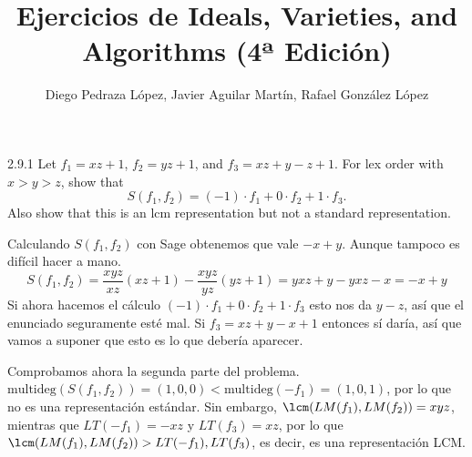\documentclass[twoside]{article}
\begin{document}
\title{Ejercicios de Ideals, Varieties, and Algorithms (4ª Edición)}
\author{Diego Pedraza López, Javier Aguilar Martín, Rafael González López}
\maketitle


\begin{ejercicio}{2.9.1}
Let $f_1 = xz +1$, $f_2 = yz+ 1$, and $f_3 = xz +y−z +1$. For lex order with $x > y > z$, show
that
$$S( f_1, f_2) = (−1)\cdot f_1 + 0\cdot  f_2 + 1 \cdot f_3.$$
Also show that this is an lcm representation but not a standard representation.
\end{ejercicio}
\begin{solucion}
Calculando $S(f_1,f_2)$ con Sage obtenemos que vale $-x+y$. Aunque tampoco es difícil hacer a mano.
\[
S(f_1,f_2)=\frac{xyz}{xz}(xz+1)-\frac{xyz}{yz}(yz+1)=yxz+y-yxz-x=-x+y
\]
Si ahora hacemos el cálculo $(−1)\cdot f_1 + 0\cdot  f_2 + 1 \cdot f_3$ esto nos da $y-z$, así que el enunciado seguramente esté mal. Si $f_3=xz +y−x +1$ entonces sí daría, así que vamos a suponer que esto es lo que debería aparecer.

Comprobamos ahora la segunda parte del problema. $\mathrm{multideg}(S( f_1, f_2))=(1,0,0)<\mathrm{multideg}(-f_1)=(1,0,1)$, por lo que no es una representación estándar. Sin embargo, $\lcm(LM(f_1),LM(f_2))=xyz$, mientras que $LT(-f_1)=-xz$ y $LT(f_3)=xz$, por lo que $\lcm(LM(f_1),LM(f_2))>LT(-f_1),LT(f_3)$, es decir, es una representación LCM. 
\end{solucion}
\newpage
\end{document}
